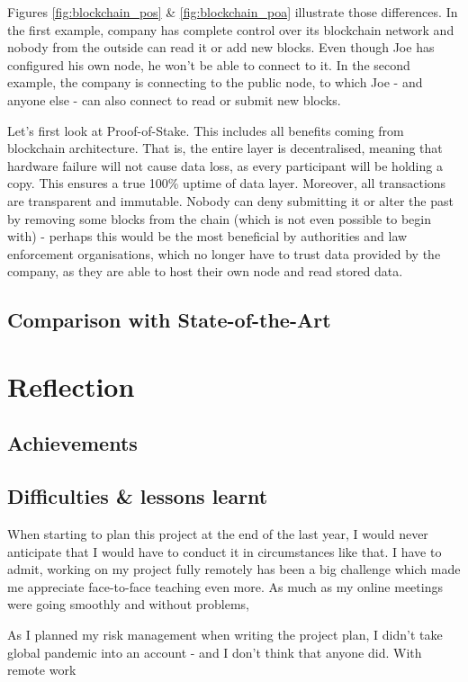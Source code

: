Figures \ref{fig:blockchain_pos} \& \ref{fig:blockchain_poa} illustrate those differences. In the first example, company has complete control over its blockchain network and nobody from the outside can read it or add new blocks. Even though Joe has configured his own node, he won't be able to connect to it. In the second example, the company is connecting to the public node, to which Joe - and anyone else - can also connect to read or submit new blocks.

Let's first look at Proof-of-Stake. This includes all benefits coming from blockchain architecture.  That is, the entire layer is decentralised, meaning that hardware failure will not cause data loss, as every participant will be holding a copy. This ensures a true 100\% uptime of data layer. Moreover, all transactions are transparent and immutable. Nobody can deny submitting it or alter the past by removing some blocks from the chain (which is not even possible to begin with) - perhaps this would be the most beneficial by authorities and law enforcement organisations, which no longer have to trust data provided by the company, as they are able to host their own node and read stored data.

\subsection{Comparison with State-of-the-Art}

\section{Reflection}

\subsection{Achievements}


\subsection{Difficulties \& lessons learnt}
When starting to plan this project at the end of the last year, I would never anticipate that I would have to conduct it in circumstances like that. I have to admit, working on my project fully remotely has been a big challenge which made me appreciate face-to-face teaching even more. As much as my online meetings were going smoothly and without problems,

As I planned my risk management when writing the project plan, I didn't take global pandemic into an account - and I don't think that anyone did. With remote work

